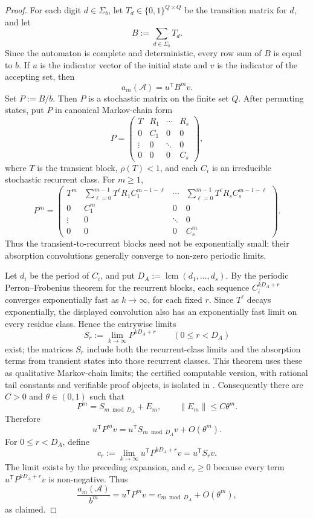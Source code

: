 \begin{proof}
  For each digit \(d\in\Sigma_b\), let \(T_d\in\{0,1\}^{Q\times Q}\) be
  the transition matrix for \(d\), and let
  \[
    B:=\sum_{d\in\Sigma_b}T_d.
  \]
  Since the automaton is complete and deterministic, every row sum of
  \(B\) is equal to \(b\). If \(u\) is the indicator vector of the
  initial state and \(v\) is the indicator of the accepting set, then
  \[
    a_m(\mathcal A)=u^{\mathsf T}B^m v.
  \]
  Set \(P:=B/b\). Then \(P\) is a stochastic matrix on the finite set
  \(Q\). After permuting states, put \(P\) in canonical Markov-chain
  form
  \[
    P=
    \begin{pmatrix}
      T & R_1 & \cdots & R_s\\
      0 & C_1 & 0 & 0\\
      \vdots & 0 & \ddots & 0\\
      0 & 0 & 0 & C_s
    \end{pmatrix},
  \]
  where \(T\) is the transient block, \(\rho(T)<1\), and each \(C_i\)
  is an irreducible stochastic recurrent class. For \(m\ge1\),
  \[
    P^m=
    \begin{pmatrix}
      T^m &
      \sum_{\ell=0}^{m-1}T^\ell R_1C_1^{m-1-\ell} &
      \cdots &
      \sum_{\ell=0}^{m-1}T^\ell R_sC_s^{m-1-\ell}\\
      0 & C_1^m & 0 & 0\\
      \vdots & 0 & \ddots & 0\\
      0 & 0 & 0 & C_s^m
    \end{pmatrix}.
  \]
  Thus the transient-to-recurrent blocks need not be exponentially
  small: their absorption convolutions generally converge to non-zero
  periodic limits.

  Let \(d_i\) be the period of \(C_i\), and put
  \(D_A:=\operatorname{lcm}(d_1,\dots,d_s)\). By the periodic
  Perron--Frobenius theorem for the recurrent blocks, each sequence
  \(C_i^{kD_A+r}\) converges exponentially fast as \(k\to\infty\), for
  each fixed \(r\). Since \(T^\ell\) decays exponentially, the displayed
  convolution also has an exponentially fast limit on every residue
  class. Hence the entrywise limits
  \[
    S_r:=\lim_{k\to\infty}P^{kD_A+r}
    \qquad(0\le r<D_A)
  \]
  exist; the matrices \(S_r\) include both the recurrent-class limits
  and the absorption terms from transient states into those recurrent
  classes. This theorem uses these as qualitative Markov-chain limits;
  the certified computable version, with rational tail constants and
  verifiable proof objects, is isolated in
  .
  Consequently there are \(C>0\) and \(\theta\in(0,1)\) such
  that
  \[
    P^m=S_{m\bmod D_A}+E_m,
    \qquad
    \|E_m\|\le C\theta^m.
  \]
  Therefore
  \[
    u^{\mathsf T}P^m v=u^{\mathsf T}S_{m\bmod D_A}v+O(\theta^m).
  \]
  For \(0\le r<D_A\), define
  \[
    c_r:=\lim_{k\to\infty}u^{\mathsf T}P^{kD_A+r}v=u^{\mathsf T}S_r v.
  \]
  The limit exists by the preceding expansion, and \(c_r\ge 0\) because
  every term \(u^{\mathsf T}P^{kD_A+r}v\) is non-negative. Thus
  \[
    \frac{a_m(\mathcal A)}{b^m}
    =u^{\mathsf T}P^m v
    =c_{m\bmod D_A}+O(\theta^m),
  \]
  as claimed.


\end{proof}
